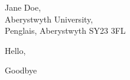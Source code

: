 \documentclass[10pt,a4paper]{letter}
\begin{document}
\begin{letter}{Jane Doe,\\ Aberystwyth University,\\ Penglais, Aberystwyth SY23 3FL} 
\opening{Hello,} 
 
\lipsum[1-3]

\closing{Goodbye} 

\end{letter} 
\end{document}
